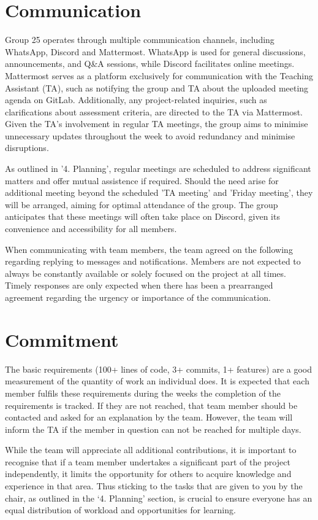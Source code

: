 \documentclass[sigconf,nonacm]{acmart}
\begin{document}
\section{Communication}
Group 25 operates through multiple communication channels, including WhatsApp, Discord and Mattermost. WhatsApp is used for general discussions, announcements, and Q\&A sessions, while Discord facilitates online meetings. Mattermost serves as a platform exclusively for communication with the Teaching Assistant (TA), such as notifying the group and TA about the uploaded meeting agenda on GitLab. Additionally, any project-related inquiries, such as clarifications about assessment criteria, are directed to the TA via Mattermost. Given the TA's involvement in regular TA meetings, the group aims to minimise unnecessary updates throughout the week to avoid redundancy and minimise disruptions.

As outlined in '4. Planning', regular meetings are scheduled to address significant matters and offer mutual assistence if required. Should the need arise for additional meeting beyond the scheduled 'TA meeting' and 'Friday meeting', they will be arranged, aiming for optimal attendance of the group. The group anticipates that these meetings will often take place on Discord, given its convenience and accessibility for all members.

When communicating with team members, the team agreed on the following regarding replying to messages and notifications. Members are not expected to always be constantly available or solely focused on the project at all times. Timely responses are only expected when there has been a prearranged agreement regarding the urgency or importance of the communication.


\section{Commitment}
The basic requirements (100+ lines of code, 3+ commits, 1+ features) are a good measurement of the quantity of work an individual does. It is expected that each member fulfils these requirements during the weeks the completion of the requirements is tracked. If they are not reached, that team member should be contacted and asked for an explanation by the team. However, the team will inform the TA if the member in question can not be reached for multiple days.

While the team will appreciate all additional contributions, it is important to recognise that if a team member undertakes a significant part of the project independently, it limits the opportunity for others to acquire knowledge and experience in that area. Thus sticking to the tasks that are given to you by the chair, as outlined in the ‘4. Planning’ section, is crucial to ensure everyone has an equal distribution of workload and opportunities for learning.
\end{document}

